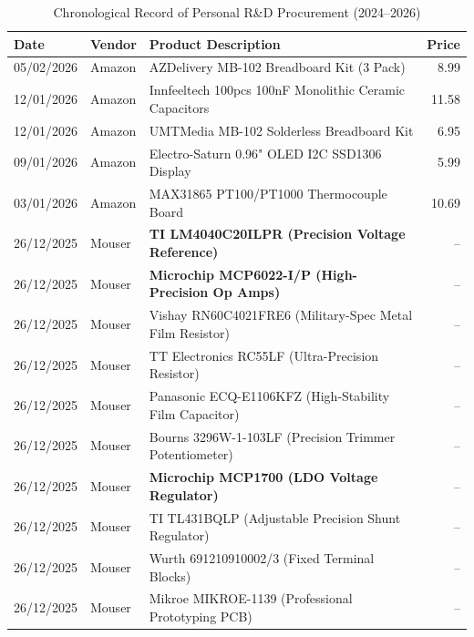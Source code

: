 \begin{table}[h!]
	\centering
	\small
	\caption{Chronological Record of Personal R\&D Procurement (2024--2026)}
	\label{tab:procurement_ledger}
	\begin{tabularx}{\textwidth}{@{} ll X r @{}}
		\toprule
		\textbf{Date} & \textbf{Vendor} & \textbf{Product Description}                             & \textbf{Price} \\ \midrule
		05/02/2026    & Amazon          & AZDelivery MB-102 Breadboard Kit (3 Pack)                & 8.99           \\
		12/01/2026    & Amazon          & Innfeeltech 100pcs 100nF Monolithic Ceramic Capacitors   & 11.58          \\
		12/01/2026    & Amazon          & UMTMedia MB-102 Solderless Breadboard Kit                & 6.95           \\
		09/01/2026    & Amazon          & Electro-Saturn 0.96" OLED I2C SSD1306 Display            & 5.99           \\
		03/01/2026    & Amazon          & MAX31865 PT100/PT1000 Thermocouple Board                 & 10.69          \\ \midrule
		26/12/2025    & Mouser          & \textbf{TI LM4040C20ILPR (Precision Voltage Reference)}  & --             \\
		26/12/2025    & Mouser          & \textbf{Microchip MCP6022-I/P (High-Precision Op Amps)}  & --             \\
		26/12/2025    & Mouser          & Vishay RN60C4021FRE6 (Military-Spec Metal Film Resistor) & --             \\
		26/12/2025    & Mouser          & TT Electronics RC55LF (Ultra-Precision Resistor)         & --             \\
		26/12/2025    & Mouser          & Panasonic ECQ-E1106KFZ (High-Stability Film Capacitor)   & --             \\
		26/12/2025    & Mouser          & Bourns 3296W-1-103LF (Precision Trimmer Potentiometer)   & --             \\
		26/12/2025    & Mouser          & \textbf{Microchip MCP1700 (LDO Voltage Regulator)}       & --             \\
		26/12/2025    & Mouser          & TI TL431BQLP (Adjustable Precision Shunt Regulator)      & --             \\
		26/12/2025    & Mouser          & Wurth 691210910002/3 (Fixed Terminal Blocks)             & --             \\
		26/12/2025    & Mouser          & Mikroe MIKROE-1139 (Professional Prototyping PCB)        & --             \\ \midrule

\end{tabularx}
\end{table}
